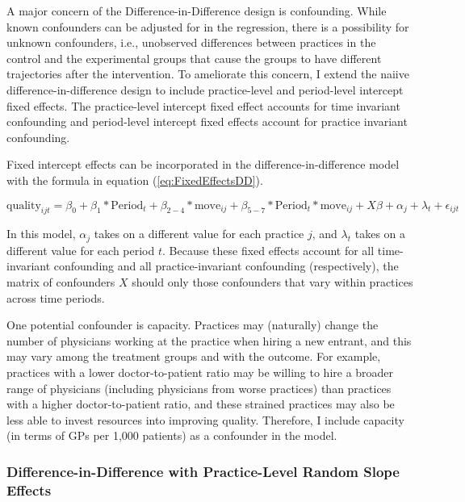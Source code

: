 \documentclass[11pt]{article}
\begin{document}
A major concern of the Difference-in-Difference design is confounding. While known confounders can be adjusted for in the regression, there is a possibility for unknown confounders, i.e., unobserved differences between practices in the control and the experimental groups that cause the groups to have different trajectories after the intervention. To ameliorate this concern, I extend the naiive difference-in-difference design to include practice-level and period-level intercept fixed effects. The practice-level intercept fixed effect accounts for time invariant confounding and period-level intercept fixed effects account for practice invariant confounding.

Fixed intercept effects can be incorporated in the difference-in-difference model with the formula in equation (\ref{eq:FixedEffectsDD}).

\begin{equation} \label{eq:FixedEffectsDD}
  \textrm{quality}_{ijt} = \beta_0 + \beta_1*\textrm{Period}_{t} + \beta_{2-4}*\textrm{move}_{ij} + \beta_{5-7}*\textrm{Period}_{ t}*\textrm{move}_{ij} + X \beta + \alpha_{j} + \lambda_{t} + \epsilon_{ijt}
\end{equation}

In this model, $\alpha_{j}$ takes on a different value for each practice $j$, and $\lambda_{t}$ takes on a different value for each period $t$. Because these fixed effects account for all time-invariant confounding and all practice-invariant confounding (respectively), the matrix of confounders $X$ should only those confounders that vary within practices across time periods.

One potential confounder is capacity. Practices may (naturally) change the number of physicians working at the practice when hiring a new entrant, and this may vary among the treatment groups and with the outcome. For example, practices with a lower doctor-to-patient ratio may be willing to hire a broader range of physicians (including physicians from worse practices) than practices with a higher doctor-to-patient ratio, and these strained practices may also be less able to invest resources into improving quality. Therefore, I include capacity (in terms of GPs per 1,000 patients) as a confounder in the model.


\subsubsection{Difference-in-Difference with Practice-Level Random Slope Effects}
\end{document}
